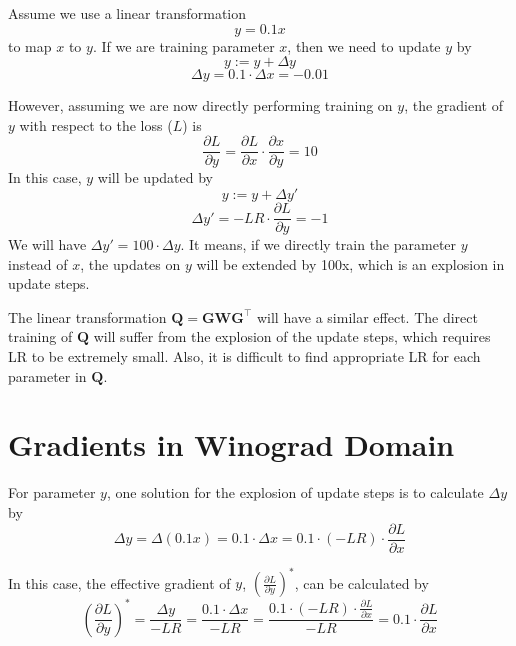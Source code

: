 \documentclass[12pt]{article} %
\begin{document}
Assume we use a linear transformation
\begin{equation}
	y = 0.1 x
\end{equation}
to map $x$ to $y$. If we are training parameter $x$, then we need to update $y$ by
\begin{equation}
	y := y + \Delta{y}
\end{equation}
\begin{equation}
	\Delta{y} = 0.1 \cdot \Delta{x} = -0.01
\end{equation}

However, assuming we are now directly performing training on $y$, the gradient of $y$ with respect to the loss ($L$) is
\begin{equation}
	\frac{\partial L}{\partial y} = \frac{\partial L}{\partial x} \cdot \frac{\partial x}{\partial y} = 10
\end{equation}
In this case, $y$ will be updated by
\begin{equation}
	y := y + \Delta{y}'
\end{equation}
\begin{equation}
	\Delta{y}' = -LR \cdot \frac{\partial L}{\partial y} = -1
\end{equation}
We will have $\Delta{y}' = 100 \cdot \Delta{y}$. It means, if we directly train the parameter $y$ instead of $x$, the updates on $y$ will be extended by 100x, which is an explosion in update steps.

The linear transformation $\boldsymbol{Q} = \boldsymbol{G} \boldsymbol{W} \boldsymbol{G}^{\top}$ will have a similar effect. The direct training of $\boldsymbol{Q}$ will suffer from the explosion of the update steps, which requires LR to be extremely small. Also, it is difficult to find appropriate LR for each parameter in $\boldsymbol{Q}$.

\section{Gradients in Winograd Domain}
For parameter $y$, one solution for the explosion of update steps is to calculate $\Delta{y}$ by
\begin{equation}
	\Delta{y} = \Delta(0.1 x)= 0.1 \cdot \Delta{x} = 0.1 \cdot (-LR) \cdot \frac{\partial L}{\partial x}
\end{equation}

In this case, the effective gradient of $y$, $(\frac{\partial L}{\partial y})^*$, can be calculated by
\begin{equation}
	(\frac{\partial L}{\partial y})^*
	= \frac{\Delta{y}}{-LR}
	= \frac{0.1 \cdot \Delta{x}}{-LR}
	= \frac{0.1 \cdot (-LR) \cdot \frac{\partial L}{\partial x}}{-LR}
	= 0.1\cdot \frac{\partial L}{\partial x}
\end{equation}
\end{document}
